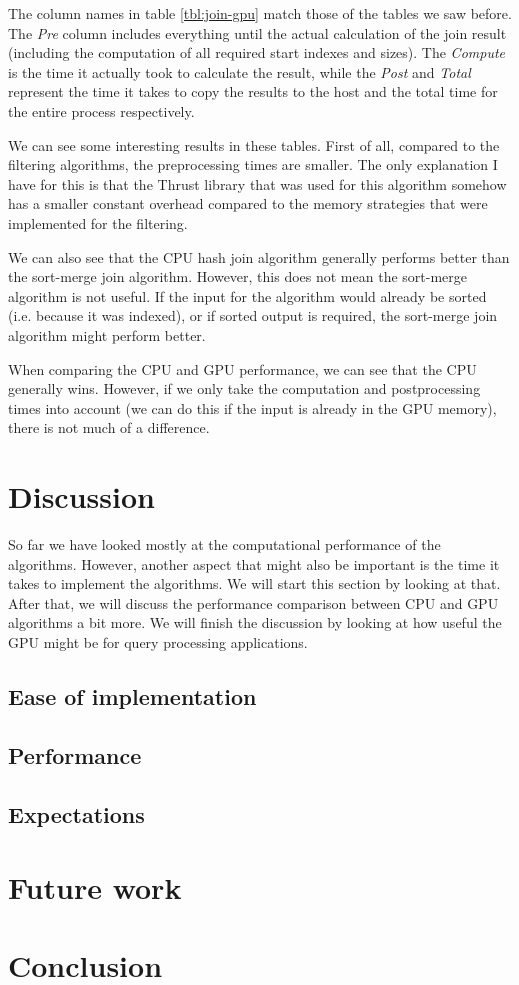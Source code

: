 \documentclass[a4paper,titlepage]{article}
\begin{document}
The column names in table \ref{tbl:join-gpu} match those of the tables we saw before. The \emph{Pre} column includes everything until the actual calculation of the join result (including the computation of all required start indexes and sizes). The \emph{Compute} is the time it actually took to calculate the result, while the \emph{Post} and \emph{Total} represent the time it takes to copy the results to the host and the total time for the entire process respectively.

We can see some interesting results in these tables. First of all, compared to the filtering algorithms, the preprocessing times are smaller. The only explanation I have for this is that the Thrust library that was used for this algorithm somehow has a smaller constant overhead compared to the memory strategies that were implemented for the filtering. 

We can also see that the CPU hash join algorithm generally performs better than the sort-merge join algorithm. However, this does not mean the sort-merge algorithm is not useful. If the input for the algorithm would already be sorted (i.e. because it was indexed), or if sorted output is required, the sort-merge join algorithm might perform better.

When comparing the CPU and GPU performance, we can see that the CPU generally wins. However, if we only take the computation and postprocessing times into account (we can do this if the input is already in the GPU memory), there is not much of a difference.

\section{Discussion}
\label{sec:discussion}
So far we have looked mostly at the computational performance of the algorithms. However, another aspect that might also be important is the time it takes to implement the algorithms. We will start this section by looking at that. After that, we will discuss the performance comparison between CPU and GPU algorithms a bit more. We will finish the discussion by looking at how useful the GPU might be for query processing applications.

\subsection{Ease of implementation}

\subsection{Performance}
\label{sec:discussion-performance}

\subsection{Expectations}

\section{Future work}

\section{Conclusion}
\label{sec:conclusion}

{}

\end{document}
